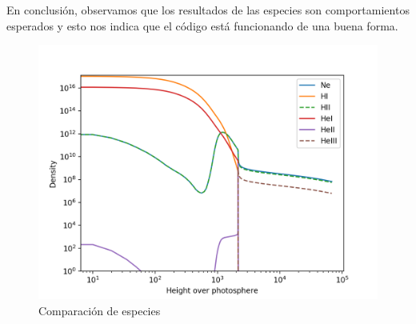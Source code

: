 \documentclass[a4paper]{article}
\begin{document}
En conclusión, observamos que los resultados de las especies son comportamientos esperados y esto nos indica que el código está funcionando de una buena forma.

\begin{figure}[!htbp]
\begin{center}
\includegraphics[width=15cm]{esp.png}
\end{center}
\caption{Comparación de especies}\label{ne}
\end{figure}





\end{document}
